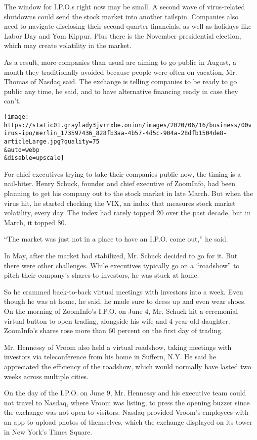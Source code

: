 The window for I.P.O.s right now may be small. A second wave of
virus-related shutdowns could send the stock market into another
tailspin. Companies also need to navigate disclosing their
second-quarter financials, as well as holidays like Labor Day and Yom
Kippur. Plus there is the November presidential election, which may
create volatility in the market.

As a result, more companies than usual are aiming to go public in
August, a month they traditionally avoided because people were often on
vacation, Mr. Thomas of Nasdaq said. The exchange is telling companies
to be ready to go public any time, he said, and to have alternative
financing ready in case they can't.

\texttt{[image: https://static01.graylady3jvrrxbe.onion/images/2020/06/16/business/00virus-ipo/merlin\_173597436\_828fb3aa-4b57-4d5c-904a-28dfb1504de8-articleLarge.jpg?quality=75\\\&auto=webp\\\&disable=upscale]}

For chief executives trying to take their companies public now, the
timing is a nail-biter. Henry Schuck, founder and chief executive of
ZoomInfo, had been planning to get his company out to the stock market
in late March. But when the virus hit, he started checking the VIX, an
index that measures stock market volatility, every day. The index had
rarely topped 20 over the past decade, but in March, it topped 80.

``The market was just not in a place to have an I.P.O. come out,'' he
said.

In May, after the market had stabilized, Mr. Schuck decided to go for
it. But there were other challenges. While executives typically go on a
``roadshow'' to pitch their company's shares to investors, he was stuck
at home.

So he crammed back-to-back virtual meetings with investors into a week.
Even though he was at home, he said, he made sure to dress up and even
wear shoes. On the morning of ZoomInfo's I.P.O. on June 4, Mr. Schuck
hit a ceremonial virtual button to open trading, alongside his wife and
4-year-old daughter. ZoomInfo's shares rose more than 60 percent on the
first day of trading.

Mr. Hennessy of Vroom also held a virtual roadshow, taking meetings with
investors via teleconference from his home in Suffern, N.Y. He said he
appreciated the efficiency of the roadshow, which would normally have
lasted two weeks across multiple cities.

On the day of the I.P.O. on June 9, Mr. Hennessy and his executive team
could not travel to Nasdaq, where Vroom was listing, to press the
opening buzzer since the exchange was not open to visitors. Nasdaq
provided Vroom's employees with an app to upload photos of themselves,
which the exchange displayed on its tower in New York's Times Square.

